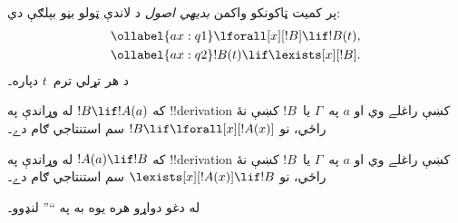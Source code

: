 \documentclass[../../../include/open-logic-section]{subfiles}
\begin{document}


\begin{defn}
پر کميت ټاکونکو واکمن \emph{بديهي اصول} د لاندې ټولو بڼو بېلګې دي:
\begin{align}
\ollabel{ax:q1} & \lforall[x][!B] \lif !B(t), \\
\ollabel{ax:q2} & !B(t) \lif \lexists[x][!B].
\end{align}
د هر تړلي ترم~$t$ دپاره۔
\end{defn}

\begin{defn}
\item که $!B \lif !A(a)$ له وړاندې په !!{derivation} کښې راغلے وي
  او $a$ په~$\Gamma$ يا~$!B$ کښې نۀ راځي، نو
  $!B \lif \lforall[x][!A(x)]$ سم استنتاجي ګام دے۔
\item که $!A(a) \lif !B$ له وړاندې په !!{derivation} کښې راغلے وي
  او $a$ په~$\Gamma$ يا~$!B$ کښې نۀ راځي، نو
  $\lexists[x][!A(x)] \lif !B$ سم استنتاجي ګام دے۔
\end{defn}

له دغو دواړو هره يوه به په ``\QR'' لنډوو۔
\end{document}
